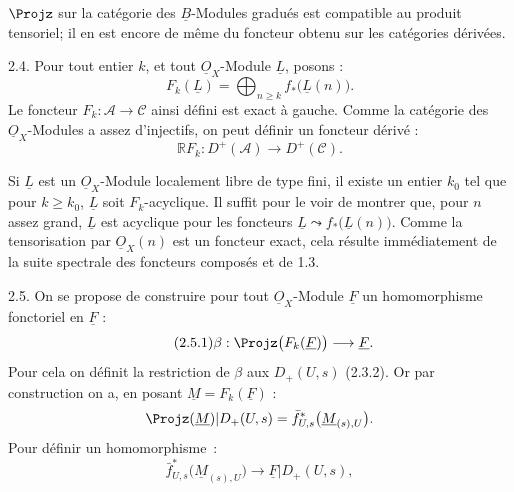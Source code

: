 
\(\Projz\) sur la catégorie des \(\underline{B}\)-Modules gradués est compatible au produit tensoriel; il en est encore de même du foncteur obtenu sur les catégories dérivées.


2.4. Pour tout entier $k$, et tout $\underline{O}_X$-Module $\underline{L}$, posons :
\begin{equation}\tag{2.4.1}
  F_k(\underline{L})=\bigoplus_{n\geq k} f_*\bigl(\underline{L}(n)\bigr).
\end{equation}
Le foncteur $F_k:\mathcal A\to\mathcal C$ ainsi défini est exact à gauche. Comme la catégorie des $\underline{O}_X$-Modules a assez d'injectifs, on peut définir un foncteur dérivé :
\begin{equation}\tag{2.4.2}
  \mathbb R F_k:D^+(\mathcal A)\longrightarrow D^+(\mathcal C).
\end{equation}

Si $\underline{L}$ est un $\underline{O}_X$-Module localement libre de type fini, il existe un entier $k_0$ tel que pour $k\geq k_0$, $\underline{L}$ soit $F_k$-acyclique. Il suffit pour le voir de montrer que, pour $n$ assez grand, $\underline{L}$ est acyclique pour les foncteurs $\underline{L}\leadsto f_*\bigl(\underline{L}(n)\bigr)$. Comme la tensorisation par $\underline{O}_X(n)$ est un foncteur exact, cela résulte immédiatement de la suite spectrale des foncteurs composés et de 1.3.

2.5. On se propose de construire pour tout $\underline{O}_X$-Module $\underline{F}$ un homomorphisme fonctoriel en $\underline{F}$ :
\begin{equation}\tag{2.5.1}
  \beta:\Projz\bigl(F_k(\underline{F})\bigr)\longrightarrow \underline{F}.
\end{equation}
Pour cela on définit la restriction de $\beta$ aux $D_+(U,s)$ (2.3.2). Or par construction on a, en posant $\underline{M}=F_k(\underline{F})$ :
\[
  \Projz(\underline{M})|D_+(U,s)
  =\bar f^{*}_{U,s}\bigl(\underline{M}_{(s),U}\bigr).
\]
Pour définir un homomorphisme~:
\[
  \bar f^{*}_{U,s}\bigl(\underline{M}_{(s),U}\bigr)\longrightarrow \underline{F}|D_+(U,s),
\]
